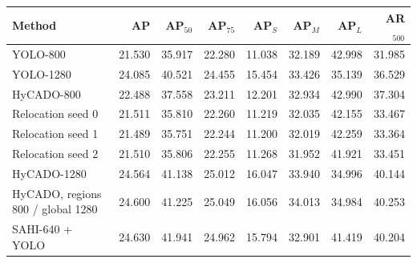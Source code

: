\begin{tabular}{lrrrrrrr}
\toprule
Method & AP & AP$_{50}$ & AP$_{75}$ & AP$_S$ & AP$_M$ & AP$_L$ & AR$_{500}$\\
\midrule
YOLO-800 & 21.530 & 35.917 & 22.280 & 11.038 & 32.189 & 42.998 & 31.985\\
YOLO-1280 & 24.085 & 40.521 & 24.455 & 15.454 & 33.426 & 35.139 & 36.529\\
HyCADO-800 & 22.488 & 37.558 & 23.211 & 12.201 & 32.934 & 42.990 & 37.304\\
Relocation seed 0 & 21.511 & 35.810 & 22.260 & 11.219 & 32.035 & 42.155 & 33.467\\
Relocation seed 1 & 21.489 & 35.751 & 22.244 & 11.200 & 32.019 & 42.259 & 33.364\\
Relocation seed 2 & 21.510 & 35.806 & 22.255 & 11.268 & 31.952 & 41.921 & 33.451\\
HyCADO-1280 & 24.564 & 41.138 & 25.012 & 16.047 & 33.940 & 34.996 & 40.144\\
HyCADO, regions 800 / global 1280 & 24.600 & 41.225 & 25.049 & 16.056 & 34.013 & 34.984 & 40.253\\
SAHI-640 + YOLO & 24.630 & 41.941 & 24.962 & 15.794 & 32.901 & 41.419 & 40.204\\
\bottomrule
\end{tabular}
